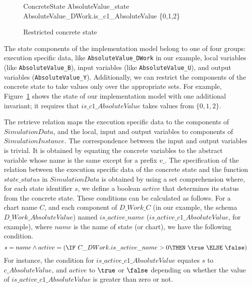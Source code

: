 \documentclass[submission]{eptcs}
\begin{document}
\begin{figure}
\begin{schema}{ConcreteState}
AbsoluteValue\_state
\where
AbsoluteValue\_DWork.is\_c1\_AbsoluteValue \in \{0,1,2\}
\end{schema}
\caption{Restricted concrete state}
\label{fig:concrete}
\end{figure}

The state components of the implementation model belong to one of four groups: execution specific data, like \texttt{AbsoluteValue\_DWork} in our example, local variables (like \texttt{AbsoluteValue\_B}), input variables (like \texttt{AbsoluteValue\_U}), and output variables (\texttt{AbsoluteValue\_Y}). Additionally, we can restrict the components of the concrete state to take values only over the appropriate sets. For example, Figure~\ref{fig:concrete} shows the state of our implementation model with one additional invariant; it requires that $is\_c1\_AbsoluteValue$ takes values from $\{0,1,2\}$.

The retrieve relation maps the execution specific data to the components of $SimulationData$, and the local, input and output variables to components of $SimulationInstance$. The correspondence between the input and output variables is trivial. It is obtained by equating the concrete variables to the abstract variable whose name is the same except for a prefix $v\_$. The specification of the relation between the execution specific data of the concrete state and the function $state\_status$ in $SimulationData$ is obtained by using a set comprehension where, for each state identifier $s$, we define a boolean $active$ that determines its status from the concrete state. These conditions can be calculated as follows. For a chart name $C$, and each component of $D\_Work\_C$ (in our example, the schema
$D\_Work\_AbsoluteValue$) named $is\_active\_name$ ($is\_active\_c1\_AbsoluteValue$, for example), where $name$ is the name of state (or chart), we have the following condition.
\[s = name \land active = (\IF~C\_DWork.is\_active\_name > 0 \THEN~\true~\ELSE~\false)\]
For instance, the condition for $is\_active\_c1\_AbsoluteValue$ equates $s$ to $c\_AbsoluteValue$, and $active$ to $\true$ or $\false$ depending on whether the value of $is\_active\_c1\_AbsoluteValue$ is greater than zero or not.
\end{document}
